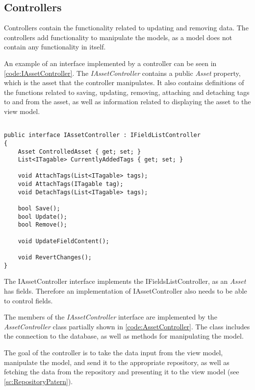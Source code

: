 \subsection{Controllers} \label{sc:Controllers}
Controllers contain the functionality related to updating and removing data. The controllers add functionality to manipulate the models, as a model does not contain any functionality in itself. 
\par
An example of an interface implemented by a controller can be seen in \autoref{code:IAssetController}. The \textit{IAssetController} contains a public \textit{Asset} property, which is the asset that the controller manipulates. It also contains definitions of the functions related to saving, updating, removing, attaching and detaching tags to and from the asset, as well as information related to displaying the asset to the view model.

\begin{listing}[H]
\begin{verbatim}

public interface IAssetController : IFieldListController
{
    Asset ControlledAsset { get; set; }
    List<ITagable> CurrentlyAddedTags { get; set; }

    void AttachTags(List<ITagable> tags);
    void AttachTags(ITagable tag);
    void DetachTags(List<ITagable> tags);

    bool Save();
    bool Update();
    bool Remove();

    void UpdateFieldContent();

    void RevertChanges();
}

\end{verbatim}
\label{code:IAssetController}
\end{listing}

The IAssetController interface implements the IFieldsListController, as an \textit{Asset} has fields. Therefore an implementation of IAssetController also needs to be able to control fields.
\par
The members of the \textit{IAssetController} interface are implemented by the \textit{AssetController} class partially shown in \autoref{code:AssetController}. The class includes the connection to the database, as well as methods for manipulating the model.
\par
The goal of the controller is to take the data input from the view model, manipulate the model, and send it to the appropriate repository, as well as fetching the data from the repository and presenting it to the view model (see \autoref{sc:RepositoryPatern}).

